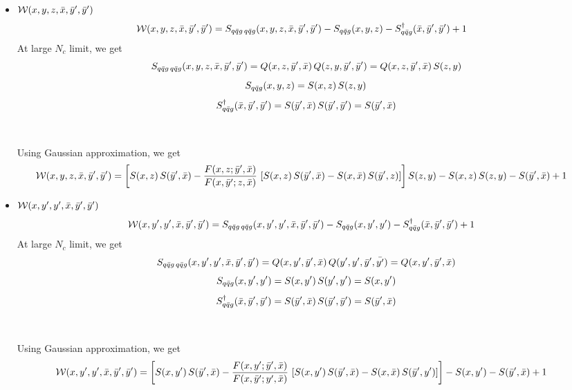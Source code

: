 \documentclass[9pt]{article}
\numberwithin{equation}{section}
\begin{document}
\begin{itemize}
Using Gaussian approximation, we get 
\begin{align}
    \mathcal{W}(x,y',y',\Bar{x},\Bar{y},\Bar{z}) &  =  \left[S(x,y')\,S(\Bar{z},\Bar{x}) - \frac{F(x,y';\Bar{z},\Bar{x})}{F(x,\Bar{z};y',\Bar{x})}\, \left[S(x,y')\,S(\Bar{z},\Bar{x})-S(x,\Bar{x})\, S(\Bar{z},y')\right]\right]\,S(\Bar{y},\Bar{z}) -  S(x,y') - S(\Bar{z},\Bar{x})\, S(\Bar{y},\Bar{z}) +1 
\end{align}
\item $\mathcal{W}(x,y,z,\Bar{x},\Bar{y}',\Bar{y}')$
\begin{align}
        \mathcal{W}(x,y,z,\Bar{x},\Bar{y}',\Bar{y}') & = S_{q\Bar{q}g\,q\Bar{q}g}(x,y,z,\Bar{x},\Bar{y}',\Bar{y}') -S_{q\Bar{q}g}(x,y,z) - S^{\dagger}_{q\Bar{q}g}(\Bar{x},\Bar{y}',\Bar{y}') + 1
    \end{align}
At large $N_{c}$ limit, we get
$$S_{q\Bar{q}g\,q\Bar{q}g}(x,y,z,\Bar{x},\Bar{y}',\Bar{y}') = Q(x,z,\Bar{y}',\Bar{x})\, Q(z,y,\Bar{y}',\Bar{y}') = Q(x,z,\Bar{y}',\Bar{x})\, S(z,y) $$
$$S_{q\Bar{q}g}(x,y,z) = S(x,z)\, S(z,y)$$
$$S^{\dagger}_{q\Bar{q}g}(\Bar{x},\Bar{y}',\Bar{y}') = S(\Bar{y}',\Bar{x})\, S(\Bar{y}',\Bar{y}') = S(\Bar{y}',\Bar{x})$$
\\ \\ 
Using Gaussian approximation, we get
\begin{align}
    \mathcal{W}(x,y,z,\Bar{x},\Bar{y}',\Bar{y}') & =  \left[S(x,z)\,S(\Bar{y}',\Bar{x}) - \frac{F(x,z;\Bar{y}',\Bar{x})}{F(x,\Bar{y}';z,\Bar{x})}\, \left[S(x,z)\,S(\Bar{y}',\Bar{x})-S(x,\Bar{x})\, S(\Bar{y}',z)\right]\right] S(z,y) - S(x,z)\, S(z,y) -  S(\Bar{y}',\Bar{x}) +1
\end{align}
\item $\mathcal{W}(x,y',y',\Bar{x},\Bar{y}',\Bar{y}')$
    \begin{align}
        \mathcal{W}(x,y',y',\Bar{x},\Bar{y}',\Bar{y}') & = S_{q\Bar{q}g\,q\Bar{q}g}(x,y',y',\Bar{x},\Bar{y}',\Bar{y}') -S_{q\Bar{q}g}(x,y',y') - S^{\dagger}_{q\Bar{q}g}(\Bar{x},\Bar{y}',\Bar{y}') + 1
    \end{align}
At large $N_{c}$ limit, we get
$$S_{q\Bar{q}g\,q\Bar{q}g}(x,y',y',\Bar{x},\Bar{y}',\Bar{y}') = Q(x,y',\Bar{y}',\Bar{x})\, Q(y',y',\Bar{y}',\Bar{y'}) = Q(x,y',\Bar{y}',\Bar{x}) $$
$$S_{q\Bar{q}g}(x,y',y') = S(x,y')\, S(y',y') = S(x,y')$$
$$S^{\dagger}_{q\Bar{q}g}(\Bar{x},\Bar{y}',\Bar{y}') = S(\Bar{y}',\Bar{x})\, S(\Bar{y}',\Bar{y}') = S(\Bar{y}',\Bar{x})$$
 \\ \\ 
Using Gaussian approximation, we get
\begin{align}
    \mathcal{W}(x,y',y',\Bar{x},\Bar{y}',\Bar{y}') & = \left[S(x,y')\,S(\Bar{y}',\Bar{x}) - \frac{F(x,y';\Bar{y}',\Bar{x})}{F(x,\Bar{y}';y',\Bar{x})}\, \left[S(x,y')\,S(\Bar{y}',\Bar{x})-S(x,\Bar{x})\, S(\Bar{y}',y')\right]\right] -S(x,y') -  S(\Bar{y}',\Bar{x}) +1
\end{align}
\end{itemize}
\end{document}
